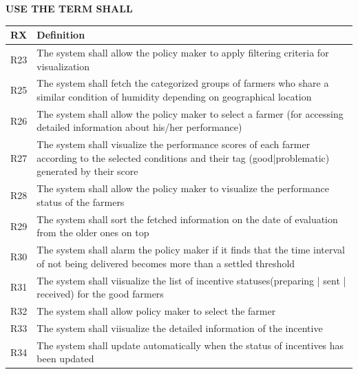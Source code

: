 \textbf{USE THE TERM SHALL}
\begin{center}
    \setlength\arrayrulewidth{1pt}
    \begin{longtable}{|c|m{}|}
            
            \hline
            \rowcolor{myblue}\color{white}RX & \color{white}Definition \\
            \hline
            \textsc{R23}     &   The system shall allow the policy maker to apply filtering criteria for visualization   \\
            \hline
            \textsc{R25}  &    The system shall fetch the categorized groups of farmers who share a similar condition of humidity depending on geographical location\\
            \hline
            \textsc{R26}  &    The system shall allow the policy maker to select a farmer (for accessing detailed information about his/her performance) \\
            \hline
            \textsc{R27}  &    The system shall visualize the performance scores of each farmer according to the selected conditions and their tag (good|problematic) generated by their score\\
            \hline
            \textsc{R28}  &    The system shall allow the policy maker to visualize the performance status of the farmers\\
            \hline
            \textsc{R29}  &    The system shall sort the fetched information on the date of evaluation from the older ones on top\\
            \hline
            \textsc{R30}  &    The system shall alarm the policy maker if it finds that the time interval of not being delivered becomes more than a settled threshold \\
            \hline
            \textsc{R31}  &    The system shall viisualize the list of incentive statuses(preparing | sent | received) for the good farmers \\
            \hline
            \textsc{R32}  &    The system shall allow policy maker to select the farmer \\
            \hline
            \textsc{R33}  &    The system shall viisualize the detailed information of the incentive \\
            \hline
            \textsc{R34}  &    The system shall update automatically when the status of incentives has been updated \\
            \hline

\end{longtable}
\end{center}
